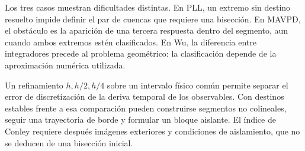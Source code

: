 Los tres casos muestran dificultades distintas. En PLL, un extremo sin
destino resuelto impide definir el par de cuencas que requiere una bisección.
En MAVPD, el obstáculo es la aparición de una tercera respuesta dentro del
segmento, aun cuando ambos extremos estén clasificados. En Wu, la diferencia
entre integradores precede al problema geométrico: la clasificación depende
de la aproximación numérica utilizada.

Un refinamiento $h,h/2,h/4$ sobre un intervalo físico común permite separar
el error de discretización de la deriva temporal de los observables. Con
destinos estables frente a esa comparación pueden construirse segmentos no
colineales, seguir una trayectoria de borde y formular un bloque aislante.
El índice de Conley requiere después imágenes exteriores y condiciones de
aislamiento, que no se deducen de una bisección inicial.
